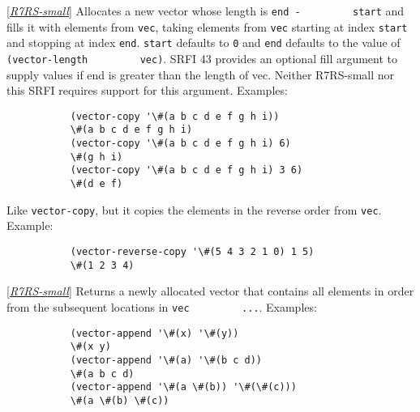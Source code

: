 \begin{entry}{%
  }

  {[}\protect\hyperlink{R7RS-small}{\emph{R7RS-small}}{]} Allocates a
  new vector whose length is \texttt{end\ -\ \ \ \ \ \ \ \ \ start}
  and fills it with elements from \texttt{vec}, taking elements from
  \texttt{vec} starting at index \texttt{start} and stopping at index
  \texttt{end}.  \texttt{start} defaults to \texttt{0} and
  \texttt{end} defaults to the value of \texttt{(vector-length\ \ \ \
    \ \ \ \ \ vec)}. SRFI 43 provides an optional fill argument to
  supply values if end is greater than the length of vec. Neither
  R7RS-small nor this SRFI requires support for this argument.
  Examples:
\begin{verbatim}
           (vector-copy '\#(a b c d e f g h i))         
           \#(a b c d e f g h i)         
           (vector-copy '\#(a b c d e f g h i) 6)        
           \#(g h i)         
           (vector-copy '\#(a b c d e f g h i) 3 6)         
           \#(d e f)         
\end{verbatim}
\end{entry}

\begin{entry}{%
   }

 Like \texttt{vector-copy}, but
  it copies the elements in the reverse order from \texttt{vec}.
  Example:
\begin{verbatim}
           (vector-reverse-copy '\#(5 4 3 2 1 0) 1 5)         
           \#(1 2 3 4)         
\end{verbatim}
\end{entry}

\begin{entry}{%
  }

  {[}\protect\hyperlink{R7RS-small}{\emph{R7RS-small}}{]} Returns a
  newly allocated vector that contains all elements in order from the
  subsequent locations in \texttt{vec\ \ \ \ \ \ \ \ \ ...}.
  Examples:
\begin{verbatim}
           (vector-append '\#(x) '\#(y))         
           \#(x y)         
           (vector-append '\#(a) '\#(b c d))         
           \#(a b c d)         
           (vector-append '\#(a \#(b)) '\#(\#(c)))         
           \#(a \#(b) \#(c))         
\end{verbatim}
\end{entry}

